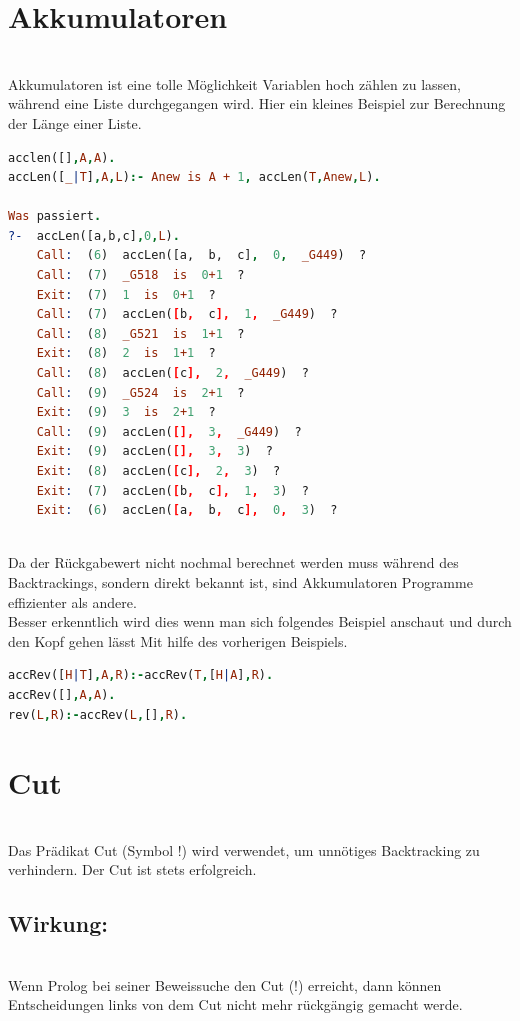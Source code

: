 \section{Akkumulatoren}\qquad\\
Akkumulatoren ist eine tolle Möglichkeit Variablen hoch zählen zu lassen, während eine Liste durchgegangen wird. Hier ein kleines Beispiel zur Berechnung der Länge einer Liste. \\
\begin{lstlisting}[language=Prolog] 
acclen([],A,A).
accLen([_|T],A,L):- Anew is A + 1, accLen(T,Anew,L).

Was passiert.
?-  accLen([a,b,c],0,L).
	Call:  (6)  accLen([a,  b,  c],  0,  _G449)  ?
	Call:  (7)  _G518  is  0+1  ?
	Exit:  (7)  1  is  0+1  ?
	Call:  (7)  accLen([b,  c],  1,  _G449)  ?
	Call:  (8)  _G521  is  1+1  ?
	Exit:  (8)  2  is  1+1  ?
	Call:  (8)  accLen([c],  2,  _G449)  ?
	Call:  (9)  _G524  is  2+1  ?
	Exit:  (9)  3  is  2+1  ?
	Call:  (9)  accLen([],  3,  _G449)  ?
	Exit:  (9)  accLen([],  3,  3)  ?
	Exit:  (8)  accLen([c],  2,  3)  ?
	Exit:  (7)  accLen([b,  c],  1,  3)  ?
	Exit:  (6)  accLen([a,  b,  c],  0,  3)  ? 
\end{lstlisting}
\newpage\qquad\\
Da der Rückgabewert nicht nochmal berechnet werden muss während des Backtrackings, sondern direkt bekannt ist, sind Akkumulatoren Programme effizienter als andere. \\
Besser erkenntlich wird dies wenn man sich folgendes Beispiel anschaut und durch den Kopf gehen lässt Mit hilfe des vorherigen Beispiels. \\
\begin{lstlisting}[language=Prolog] 
accRev([H|T],A,R):-accRev(T,[H|A],R).
accRev([],A,A).
rev(L,R):-accRev(L,[],R).
\end{lstlisting}
\section{Cut}\qquad\\
Das Prädikat Cut (Symbol !) wird verwendet, um unnötiges Backtracking zu verhindern. Der Cut ist stets erfolgreich.\\
\subsection{Wirkung:}\qquad\\
Wenn Prolog bei seiner Beweissuche den Cut (!) erreicht, dann können Entscheidungen links von dem Cut nicht mehr rückgängig gemacht werde.
